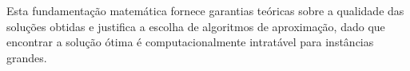\documentclass[12pt, a4paper]{report}
\begin{document}
Esta fundamentação matemática fornece garantias teóricas sobre a qualidade das soluções obtidas e justifica a escolha de algoritmos de aproximação, dado que encontrar a solução ótima é computacionalmente intratável para instâncias grandes.

\newpage
\renewcommand{\refname}{Referências Bibliográficas}

\nocite{*}
\end{document}

